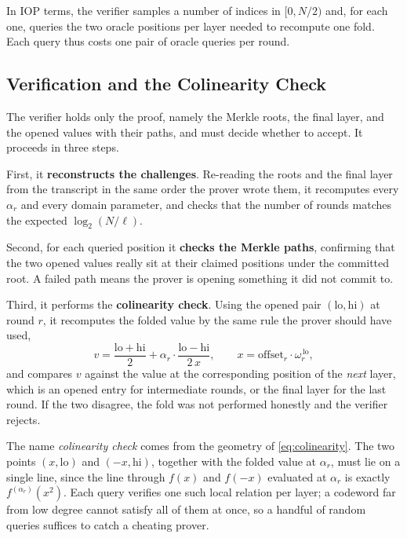In IOP terms, the verifier samples a number of indices in $[0, N/2)$
and, for each one, queries the two oracle positions per layer needed to
recompute one fold. Each query thus costs one pair of oracle queries per
round.


\subsection{Verification and the Colinearity Check}
\label{subsec:verification}

The verifier holds only the proof, namely the Merkle roots, the final
layer, and the opened values with their paths, and must decide whether to
accept. It proceeds in three steps.

First, it \textbf{reconstructs the challenges}. Re-reading the roots and
the final layer from the transcript in the same order the prover wrote
them, it recomputes every $\alpha_r$ and every domain parameter, and
checks that the number of rounds matches the expected
$\log_2(N/\ell)$.

Second, for each queried position it \textbf{checks the Merkle paths},
confirming that the two opened values really sit at their claimed
positions under the committed root. A failed path means the prover is
opening something it did not commit to.

Third, it performs the \textbf{colinearity check}. Using the opened pair
$(\mathrm{lo}, \mathrm{hi})$ at round $r$, it recomputes the folded value
by the same rule the prover should have used,
%
\begin{equation}
\label{eq:colinearity}
v = \frac{\mathrm{lo} + \mathrm{hi}}{2}
  + \alpha_r \cdot \frac{\mathrm{lo} - \mathrm{hi}}{2\,x},
\qquad x = \mathrm{offset}_r \cdot \omega_r^{\,\mathrm{lo}},
\end{equation}
%
and compares $v$ against the value at the corresponding position of the
\emph{next} layer, which is an opened entry for intermediate rounds, or
the final layer for the last round. If the two disagree, the fold was not
performed honestly and the verifier rejects.

The name \emph{colinearity check} comes from the geometry of
\cref{eq:colinearity}. The two points $(x, \mathrm{lo})$ and
$(-x, \mathrm{hi})$, together with the folded value at $\alpha_r$, must
lie on a single line, since the line through $f(x)$ and $f(-x)$ evaluated
at $\alpha_r$ is exactly $f^{(\alpha_r)}(x^2)$. Each query verifies one
such local relation per layer; a codeword far from low degree cannot
satisfy all of them at once, so a handful of random queries suffices to
catch a cheating prover.

